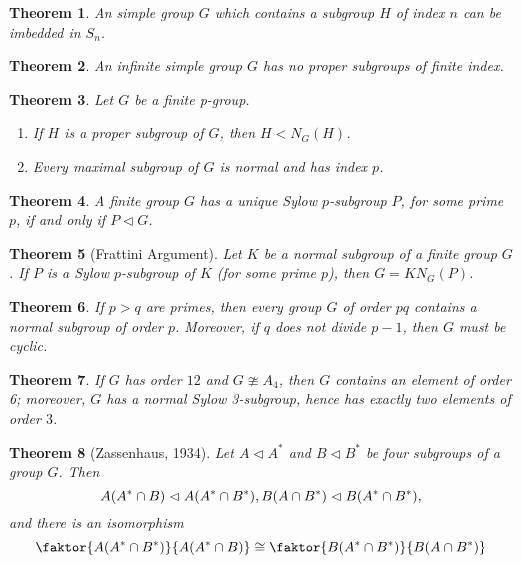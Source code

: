 \documentclass[12pt]{report}
\newtheorem{theorem}{Theorem}[chapter]
\theoremstyle{definition}
\begin{document}
\begin{theorem}
	An simple group $G$ which contains a subgroup $H$ of index $n$ can be imbedded in $S_n$.
\end{theorem}

\begin{theorem}
	An infinite simple group $G$ has no proper subgroups of finite index.
\end{theorem}

\begin{theorem}
	Let $G$ be a finite p-group.
	\begin{enumerate}
		\item If $H$ is a proper subgroup of $G$, then $H<N_G(H)$.
		\item Every maximal subgroup of $G$ is normal and has index $p$.
	\end{enumerate}
\end{theorem}

\begin{theorem}
	A finite group $G$ has a unique Sylow $p$-subgroup $P$, for some prime $p$, if and only if $P\vartriangleleft G$.
\end{theorem}

\begin{theorem}[Frattini Argument]
	Let $K$ be a normal subgroup of a finite group $G$. If $P$ is a Sylow $p$-subgroup of $K$ (for some prime $p$), then $G=KN_G(P)$.
\end{theorem}

\begin{theorem}
	If $p>q$ are primes, then every group $G$ of order $pq$ contains a normal subgroup of order $p$. Moreover, if $q$ does not divide $p-1$, then $G$ must be cyclic.
\end{theorem}

\begin{theorem}
	If $G$ has order $12$ and $G\ncong A_4$, then $G$ contains an element of order 6; moreover, $G$ has a normal Sylow 3-subgroup, hence has exactly two elements of order $3$.
\end{theorem}


\begin{theorem}[Zassenhaus, 1934]
	Let $A\vartriangleleft A^*$ and $B\vartriangleleft B^*$ be four subgroups of a group $G$. Then
	\[
		A(A^*\cap B) \vartriangleleft A(A^*\cap B^*),\\
		B(A\cap B^*) \vartriangleleft B(A^*\cap B^*),
	\]
	and there is an isomorphism
	\[
		\faktor{A(A^*\cap B^*)}{A(A^*\cap B)}\cong\faktor{B(A^*\cap B^*)}{B(A\cap B^*)}
	\]
\end{theorem}
\end{document}
